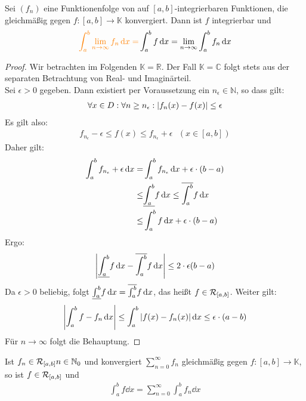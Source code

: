 \begin{Satz}{
	Sei $(f_n)$ eine Funktionenfolge von auf $[a,b]$-integrierbaren Funktionen, 
	die gleichmäßig gegen $f:[a,b] \rightarrow \mathbb{K}$ konvergiert. Dann ist 
	$f$ integrierbar und 
	\begin{align*}
		\textcolor{orange}{\int_a^b \lim\limits_{n \rightarrow  \infty}{f_n \dd{x}} =}		
		\int_a^b f \dd{x} = \lim\limits_{n \rightarrow \infty} \int_a^b f_n \dd{x}
	\end{align*}
}\end{Satz}
\begin{proof}
	Wir betrachten im Folgenden $\mathbb{K} = \mathbb{R}$. Der Fall $\mathbb{K} 
	= \mathbb{C}$ folgt stets aus der separaten Betrachtung von Real- und 
	Imaginärteil. \\
	Sei $\epsilon > 0$ gegeben. Dann existiert per Voraussetzung ein $n_{\epsilon} 
	\in \mathbb{N}$, so dass gilt:
	\begin{align*}
		\forall x \in D: \forall n \geq n_{\epsilon} : \abs{f_n(x) - f(x) } \leq 
		\epsilon
	\end{align*}
	Es gilt also: 
	\begin{align*}
		f_{n_{\epsilon}} - \epsilon \leq f(x) \leq f_{n_{\epsilon}} + \epsilon 
		\text{ }(x \in [a,b])
	\end{align*}		
	Daher gilt:
	\begin{align*}
		\int_a^b f_{n_{\epsilon}} + \epsilon \dd{x} 
		= & \int_a^b f_{n_{\epsilon}} \dd{x} + \epsilon \cdot (b-a) \\
		\leq & \underline{\int_{a}^{b}} f \dd{x} \leq \overline{\int_{a}^{b}} f \dd{x} \\
		\leq & \int_a^b f\dd{x} + \epsilon\cdot (b-a)
	\end{align*}
	Ergo:
	\begin{align*}
		\abs{\underline{\int_{a}^{b}} f \dd{x} - \overline{\int_{a}^{b}} f \dd{x} } \leq 2 \cdot \epsilon (b-a)
	\end{align*}
	Da $\epsilon > 0$ beliebig, folgt $\underline{\int_{a}^{b}} f \dd{x} = \overline{\int_{a}^{b}} f \dd{x}$, 
	das heißt $f \in \mathcal{R}_{[{a},{b}]}$.
	Weiter gilt:
	\begin{align*}
		\abs{ \int_a^b f - f_n \dd{x} } \leq \int_a^b \abs{ f(x) - f_n(x) }\dd{x}
		\leq \epsilon\cdot (a-b)
	\end{align*}
	Für $n \rightarrow \infty$ folgt die Behauptung.
\end{proof}

\begin{Korollar}{
	Ist $f_n \in \mathcal{R}_{[{a},{b}]} n \in \mathbb{N}_0$ und konvergiert 
	$\sum_{n = 0}^{\infty} f_n$ gleichmäßig gegen $f: [a,b] \rightarrow \mathbb{K}$, 
	so ist $f \in \mathcal{R}_{[{a},{b}]}$ und 
	\begin{align*}
		\int_a^b f\dd{x} = \sum_{n=0}^{\infty} \int_a^b f_n \dd{x}
	\end{align*}
}\end{Korollar}


